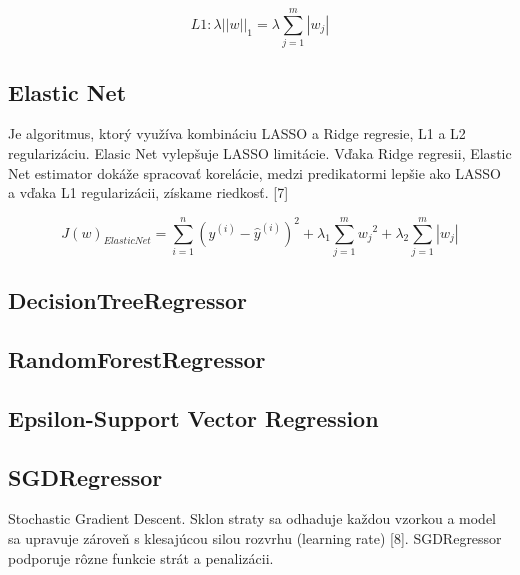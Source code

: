 \[L1: \lambda ||w || _{1} = \lambda \sum_{j=1}^{m}\left | w_{j} \right |\]

\subsection{Elastic Net}
Je algoritmus, ktorý využíva kombináciu LASSO a Ridge regresie, L1 a L2 regularizáciu. Elasic Net vylepšuje LASSO limitácie. Vďaka Ridge regresii, Elastic Net estimator dokáže spracovať korelácie, medzi predikatormi lepšie ako LASSO a vďaka L1 regularizácii, získame riedkosť. [7]

\[J(w)_{ElasticNet} = \sum_{i=1}^{n}(y^{(i)} - \hat{y}^{(i)})^{2} + \lambda _{1}\sum_{j=1}^{m} {w_{j}}^{2}+ \lambda_{2} \sum_{j=1}^{m}\left | w_{j} \right | \]

\subsection{DecisionTreeRegressor}
\subsection{RandomForestRegressor}
\subsection{Epsilon-Support Vector Regression}

\subsection{SGDRegressor}
Stochastic Gradient Descent. Sklon straty sa odhaduje každou vzorkou a model sa upravuje zároveň s klesajúcou silou rozvrhu (learning rate) [8]. SGDRegressor podporuje rôzne funkcie strát a penalizácii. 
